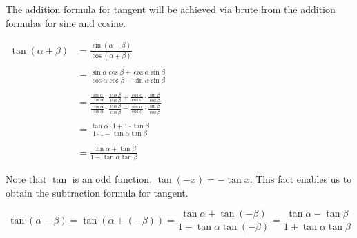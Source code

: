 \documentclass[12pt]{article}
\begin{document}
The addition formula for tangent will be achieved via brute  from the addition formulas for sine and cosine.

\begin{center}
$\begin{array}{rl}
\tan(\alpha+\beta) & =\displaystyle \frac{\sin(\alpha+\beta)}{\cos(\alpha+\beta)} \\
& \\
& =\displaystyle \frac{\sin \alpha \cos \beta +\cos \alpha \sin \beta}{\cos \alpha \cos \beta -\sin \alpha \sin \beta} \\
& \\
& =\displaystyle \frac{ \displaystyle \frac{\sin \alpha}{\cos \alpha} \cdot \frac{\cos \beta}{\cos \beta}+\displaystyle \frac{\cos \alpha}{\cos \alpha} \cdot \frac{\sin \beta}{\cos \beta}}{ \displaystyle \frac{\cos \alpha}{\cos \alpha} \cdot \frac{\cos \beta}{\cos \beta}-\frac{\sin \alpha}{\cos \alpha} \cdot \frac{\sin \beta}{\cos \beta}} \\
& \\
& =\displaystyle \frac{ \tan \alpha \cdot 1+1 \cdot \tan \beta}{1 \cdot 1-\tan \alpha \tan \beta} \\
& \\
& =\displaystyle \frac{ \tan \alpha+\tan \beta}{1-\tan \alpha \tan \beta} \end{array}$
\end{center}

Note that $\tan$ is an odd function,  $\tan(-x)=-\tan x$.  This fact enables us to obtain the subtraction formula for tangent.

$$\tan(\alpha-\beta)=\tan(\alpha+(-\beta))=\frac{ \tan \alpha+\tan(-\beta)}{1-\tan \alpha \tan(-\beta)}=\frac{ \tan \alpha-\tan \beta}{1+\tan \alpha \tan \beta}$$
\end{document}
